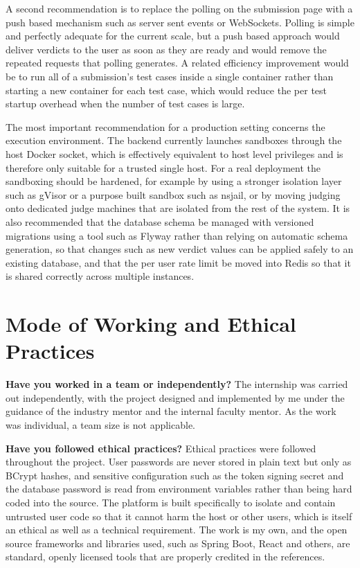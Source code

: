 \documentclass[12pt,a4paper]{report}
\begin{document}
A second recommendation is to replace the polling on the submission page with a push based mechanism such as server sent events or WebSockets. Polling is simple and perfectly adequate for the current scale, but a push based approach would deliver verdicts to the user as soon as they are ready and would remove the repeated requests that polling generates. A related efficiency improvement would be to run all of a submission's test cases inside a single container rather than starting a new container for each test case, which would reduce the per test startup overhead when the number of test cases is large.

The most important recommendation for a production setting concerns the execution environment. The backend currently launches sandboxes through the host Docker socket, which is effectively equivalent to host level privileges and is therefore only suitable for a trusted single host. For a real deployment the sandboxing should be hardened, for example by using a stronger isolation layer such as gVisor or a purpose built sandbox such as nsjail, or by moving judging onto dedicated judge machines that are isolated from the rest of the system. It is also recommended that the database schema be managed with versioned migrations using a tool such as Flyway rather than relying on automatic schema generation, so that changes such as new verdict values can be applied safely to an existing database, and that the per user rate limit be moved into Redis so that it is shared correctly across multiple instances.

\section*{Mode of Working and Ethical Practices}

\textbf{Have you worked in a team or independently?} The internship was carried out independently, with the project designed and implemented by me under the guidance of the industry mentor and the internal faculty mentor. As the work was individual, a team size is not applicable.

\textbf{Have you followed ethical practices?} Ethical practices were followed throughout the project. User passwords are never stored in plain text but only as BCrypt hashes, and sensitive configuration such as the token signing secret and the database password is read from environment variables rather than being hard coded into the source. The platform is built specifically to isolate and contain untrusted user code so that it cannot harm the host or other users, which is itself an ethical as well as a technical requirement. The work is my own, and the open source frameworks and libraries used, such as Spring Boot, React and others, are standard, openly licensed tools that are properly credited in the references.
\end{document}
